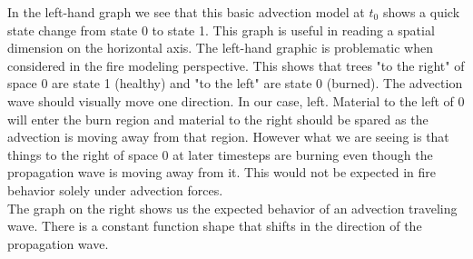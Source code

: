 \documentclass{article}
\begin{document}
    \vspace{.5cm}
In the left-hand graph we see that this basic advection model at $t_0$ shows a quick state change from state 0 to state 1.  This graph is useful in reading a spatial dimension on the horizontal axis.    The left-hand graphic is problematic when considered in the fire modeling perspective. This shows that trees "to the right" of space 0 are state 1 (healthy) and "to the left" are state 0 (burned). The advection wave should visually move one direction.  In our case, left.  Material to the left of 0 will enter the burn region and material to the right should be spared as the advection is moving away from that region.  However what we are seeing is that things to the right of space 0 at later timesteps are burning even though the propagation wave is moving away from it.  This would not be expected in fire behavior solely under advection forces. \\
The graph on the right shows us the expected behavior of an advection traveling wave. There is a constant function shape that shifts in the direction of the propagation wave. 
\end{document}
